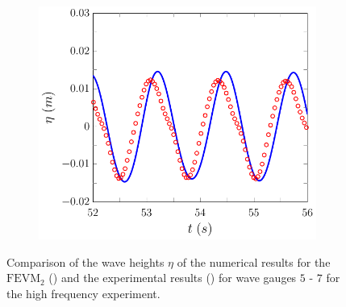 \begin{figure}
\begin{subfigure}{0.5\textwidth}
		\vspace{0.5cm}
	\end{subfigure}
	\begin{subfigure}{0.5\textwidth}
		\includegraphics[width=\textwidth]{./chp6/figures/Experiment/Beji/sh/FEVMWG7.pdf}
		\vspace{0.5cm}
	\end{subfigure}
	\caption{Comparison of the wave heights $\eta$ of the numerical results for the $\text{FEVM}_2$ ({\color{blue}\solidrule}) and the experimental results () for wave gauges $5$ - $7$ for the high frequency experiment.}
	\label{fig:BejishWG5to7FEVM}
\end{figure}


